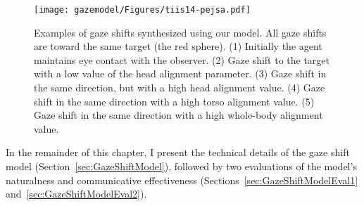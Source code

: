\begin{figure*}
\centering
\texttt{[image: gazemodel/Figures/tiis14-pejsa.pdf]}
\caption{Examples of gaze shifts synthesized using our model. All gaze shifts are toward the same target (the red sphere). (1) Initially the agent maintains eye contact with the observer. (2) Gaze shift to the target with a low value of the head alignment parameter. (3) Gaze shift in the same direction, but with a high head alignment value. (4) Gaze shift in the same direction with a high torso alignment value. (5) Gaze shift in the same direction with a high whole-body alignment value.}
\label{fig:GazeShiftExamples}
\end{figure*}

In the remainder of this chapter, I present the technical details of the gaze shift model (Section~\ref{sec:GazeShiftModel}), followed by two evaluations of the model's naturalness and communicative effectiveness (Sections~\ref{sec:GazeShiftModelEval1} and~\ref{sec:GazeShiftModelEval2}).
